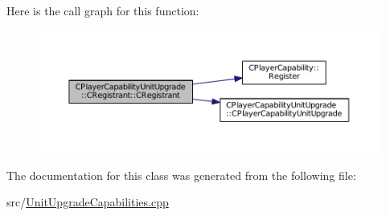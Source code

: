 Here is the call graph for this function\+:\nopagebreak
\begin{figure}[H]
\begin{center}
\leavevmode
\includegraphics[width=350pt]{classCPlayerCapabilityUnitUpgrade_1_1CRegistrant_a8f2e3658c14746284f855fadb0bfa84d_cgraph}
\end{center}
\end{figure}


The documentation for this class was generated from the following file\+:\begin{DoxyCompactItemize}
\item 
src/\hyperlink{UnitUpgradeCapabilities_8cpp}{Unit\+Upgrade\+Capabilities.\+cpp}\end{DoxyCompactItemize}
